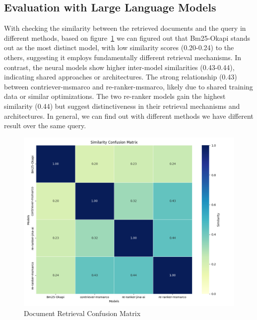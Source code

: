 \subsection{Evaluation with Large Language Models}\label{subsec:evaluation-with-large-language-models}
With checking the similarity between the retrieved documents and the query in different methods, based on figure~\ref{fig:document_retrieval_confusion_matrix_1} we can figured out that Bm25-Okapi stands out as the most distinct model, with low similarity scores (0.20-0.24) to the others, suggesting it employs fundamentally different retrieval mechanisms.
In contrast, the neural models show higher inter-model similarities (0.43-0.44), indicating shared approaches or architectures.
The strong relationship (0.43) between contriever-msmarco and re-ranker-msmarco, likely due to shared training data or similar optimizations.
The two re-ranker models gain the highest similarity (0.44) but suggest distinctiveness in their retrieval mechanisms and architectures.
In general, we can find out with different methods we have different result over the same query.

\begin{figure}[ht!]
    \centering
    \begin{minipage}[b]{0.45\textwidth}
        \centering
        \includegraphics[width=\textwidth]{res/ret_result_sim_1}
        \caption{Document Retrieval Confusion Matrix}
        \label{fig:document_retrieval_confusion_matrix_1}
    \end{minipage}
\end{figure}

